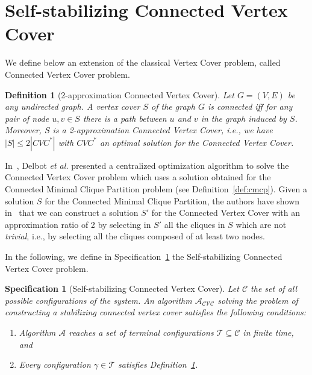 \documentclass[11pt,letterpaper,onecolumn]{article}
\newtheorem{definition}{Definition}
\newtheorem{spec}{Specification}
\begin{document}
\section{Self-stabilizing Connected Vertex Cover}
\label{sec:cvc}

We define below an extension of the classical Vertex Cover problem, called Connected Vertex Cover problem.

\begin{definition}[2-approximation Connected Vertex Cover]
\label{def:cvc}
Let $G=(V,E)$ be any undirected graph. A vertex cover $S$ of the graph $G$ is \emph{connected} iff for any pair of node $u,v \in S$ there is a path between $u$ and $v$ in the graph induced by $S$. Moreover, $S$ is a 2-approximation Connected Vertex Cover, i.e., we have $|S| \leq 2|CVC^*|$ with $CVC^*$ an optimal solution for the Connected Vertex Cover.
\end{definition}

In~\cite{DelbotLP13}, Delbot \emph{et al.} presented a centralized optimization algorithm to solve the Connected Vertex Cover problem which uses a solution obtained for the Connected Minimal Clique Partition problem (see Definition~\ref{def:cmcp}). Given a solution $S$ for the Connected Minimal Clique Partition, the authors have shown in~\cite{DelbotLP13} that we can construct a solution $S'$ for the Connected Vertex Cover with an approximation ratio of 2 by selecting in $S'$ all the cliques in $S$ which are not \emph{trivial}, i.e., by selecting all the cliques composed of at least two nodes.  

In the following, we define in Specification~\ref{spec:cvc} the Self-stabilizing Connected Vertex Cover problem.

\begin{spec}[Self-stabilizing Connected Vertex Cover]
\label{spec:cvc}
Let $\mathcal{C}$ the set of all possible configurations of the system. An algorithm $\mathcal{A_{CVC}}$ solving the problem of constructing a stabilizing connected vertex cover satisfies the following conditions:
\begin{enumerate}
\item Algorithm $\mathcal{A}$ reaches a set of terminal configurations $\mathcal{T} \subseteq \mathcal{C}$ in finite time, and
\item Every configuration $\gamma \in \mathcal{T}$ satisfies Definition~\ref{def:cvc}.
\end{enumerate}
\end{spec}
\end{document}
